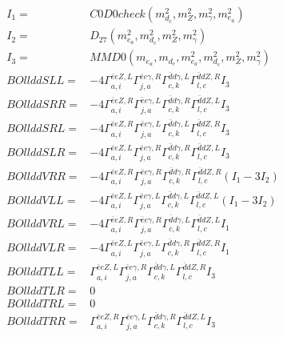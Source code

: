 \documentclass[A4,landscape]{article}
\begin{document}
\begin{align} 
I_1 = & C0D0check(m^2_{d_{{c}}}, m^2_{Z}, m^2_{\gamma}, m^2_{e_{{a}}}) \\ 
I_2 = & D_{27}(m^2_{e_{{a}}}, m^2_{d_{{c}}}, m^2_{Z}, m^2_{\gamma}) \\ 
I_3 = & MMD0(m_{e_{{a}}}, m_{d_{{c}}}, m^2_{e_{{a}}}, m^2_{d_{{c}}}, m^2_{Z}, m^2_{\gamma}) \\ 
  BOllddSLL= & -4  \Gamma^{\bar{e}e Z ,L}_{a, i} \Gamma^{\bar{e}e \gamma ,R}_{j, a} \Gamma^{\bar{d}d \gamma ,L}_{c, k} \Gamma^{\bar{d}d Z ,R}_{l, c} I_3 \\ 
  BOllddSRR= & -4  \Gamma^{\bar{e}e Z ,R}_{a, i} \Gamma^{\bar{e}e \gamma ,L}_{j, a} \Gamma^{\bar{d}d \gamma ,R}_{c, k} \Gamma^{\bar{d}d Z ,L}_{l, c} I_3 \\ 
  BOllddSRL= & -4  \Gamma^{\bar{e}e Z ,R}_{a, i} \Gamma^{\bar{e}e \gamma ,L}_{j, a} \Gamma^{\bar{d}d \gamma ,L}_{c, k} \Gamma^{\bar{d}d Z ,R}_{l, c} I_3 \\ 
  BOllddSLR= & -4  \Gamma^{\bar{e}e Z ,L}_{a, i} \Gamma^{\bar{e}e \gamma ,R}_{j, a} \Gamma^{\bar{d}d \gamma ,R}_{c, k} \Gamma^{\bar{d}d Z ,L}_{l, c} I_3 \\ 
  BOllddVRR= & -4  \Gamma^{\bar{e}e Z ,R}_{a, i} \Gamma^{\bar{e}e \gamma ,R}_{j, a} \Gamma^{\bar{d}d \gamma ,R}_{c, k} \Gamma^{\bar{d}d Z ,R}_{l, c} (I_1 - 3 I_2) \\ 
  BOllddVLL= & -4  \Gamma^{\bar{e}e Z ,L}_{a, i} \Gamma^{\bar{e}e \gamma ,L}_{j, a} \Gamma^{\bar{d}d \gamma ,L}_{c, k} \Gamma^{\bar{d}d Z ,L}_{l, c} (I_1 - 3 I_2) \\ 
  BOllddVRL= & -4  \Gamma^{\bar{e}e Z ,R}_{a, i} \Gamma^{\bar{e}e \gamma ,R}_{j, a} \Gamma^{\bar{d}d \gamma ,L}_{c, k} \Gamma^{\bar{d}d Z ,L}_{l, c} I_1 \\ 
  BOllddVLR= & -4  \Gamma^{\bar{e}e Z ,L}_{a, i} \Gamma^{\bar{e}e \gamma ,L}_{j, a} \Gamma^{\bar{d}d \gamma ,R}_{c, k} \Gamma^{\bar{d}d Z ,R}_{l, c} I_1 \\ 
  BOllddTLL= &  \Gamma^{\bar{e}e Z ,L}_{a, i} \Gamma^{\bar{e}e \gamma ,R}_{j, a} \Gamma^{\bar{d}d \gamma ,L}_{c, k} \Gamma^{\bar{d}d Z ,R}_{l, c} I_3 \\ 
  BOllddTLR= & 0 \\ 
  BOllddTRL= & 0 \\ 
  BOllddTRR= &  \Gamma^{\bar{e}e Z ,R}_{a, i} \Gamma^{\bar{e}e \gamma ,L}_{j, a} \Gamma^{\bar{d}d \gamma ,R}_{c, k} \Gamma^{\bar{d}d Z ,L}_{l, c} I_3 \\ 
\end{align} 
\end{document}
